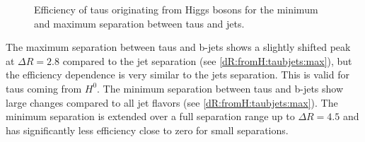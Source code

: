 \begin{figure}
\begin{subfigure}[t]{0.49\textwidth}
                \label{dR:fromH:taujets:max}
                \end{subfigure}
\caption[Efficiency of taus originating from Higgs bosons for the separation between taus and jets.]{Efficiency of taus originating from Higgs bosons for the minimum and maximum separation between taus and jets.}
\label{dR:fromH:taujets}
\end{figure}
%
The maximum separation between taus and b-jets shows a slightly shifted peak at $\Delta R=2.8$ compared to the jet separation (see \ref{dR:fromH:taubjets:max}), but the efficiency dependence is very similar to the jets separation. This is valid for taus coming from $H^0$. The minimum separation between taus and b-jets show large changes compared to all jet flavors (see \ref{dR:fromH:taubjets:max}). The minimum separation is extended over a full separation range up to $\Delta R=4.5$ and has significantly less efficiency close to zero for small separations.
%
